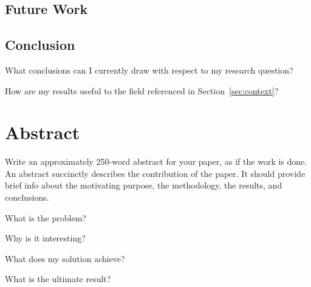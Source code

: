 \documentclass[oneside]{article} %
\begin{document}


\subsection{Future Work}
\label{sec:future}




\subsection{Conclusion}
\label{sec:conclusion}
What conclusions can I currently draw with respect to my research question? 
\qbox

How are my results useful to the field referenced in Section~\ref{sec:context}? 
\qbox


\section{Abstract}
\label{sec:abs}
Write an approximately 250-word abstract for your paper, as if the work is done. An abstract succinctly describes the contribution of the paper. It should provide brief info about the motivating purpose, the methodology, the results, and conclusions.
\begin{compactlist}
\item What is the problem?
\item Why is it interesting?
\item What does my solution achieve?
\item What is the ultimate result?
\end{compactlist}
\end{document}
